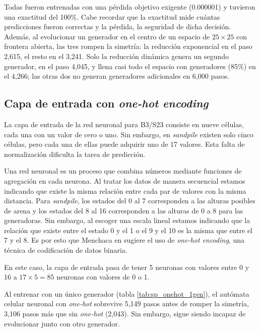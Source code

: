 Todas fueron entrenadas con una pérdida objetivo exigente (0.000001) y tuvieron una exactitud del 100\%. Cabe recordar que la exactitud mide cuántas predicciones fueron correctas y la pérdida, la seguridad de dicha decisión. Además, al evolucionar un generador en el centro de un espacio de $25 \times 25$ con frontera abierta, las tres rompen la simetría: la reducción exponencial en el paso 2,615, el resto en el 3,241. Solo la reducción dinámica genera un segundo generador, en el paso 4,045, y llena casi todo el espacio con generadores (85\%) en el 4,266; las otras dos no generan generadores adicionales en 6,000 pasos.

\subsection{Capa de entrada con \textit{one-hot encoding}}

La capa de entrada de la red neuronal para B3/S23 consiste en nueve células, cada una con un valor de cero o uno. Sin embargo, en \textit{sandpile} existen solo cinco células, pero cada una de ellas puede adquirir uno de 17 valores. Esta falta de normalización dificulta la tarea de predicción. 

Una red neuronal es un proceso que combina números mediante funciones de agregación en cada neurona. Al tratar los datos de manera secuencial estamos indicando que existe la misma relación entre cada par de valores con la misma distancia. Para \textit{sandpile}, los estados del 0 al 7 corresponden a las alturas posibles de arena y los estados del 8 al 16 corresponden a las alturas de 0 a 8 para las generadoras. Sin embargo, al escoger una escala lineal estamos indicando que la relación que existe entre el estado 0 y el 1 o el 9 y el 10 es la misma que entre el 7 y el 8. Es por esto que Menchaca en \cite{MenchacaMendez2022} sugiere el uso de \textit{one-hot encoding}, una técnica de codificación de datos binaria.

En este caso, la capa de entrada pasa de tener 5 neuronas con valores entre 0 y 16 a $17 \times 5 = 85$ neuronas con valores de 0 o 1.

Al entrenar con un único generador (tabla \ref{tab:sp_onehot_1gen}), el autómata celular neuronal con \textit{one-hot} sobrevive 5,149 pasos antes de romper la simetría, 3,106 pasos más que sin \textit{one-hot} (2,043). Sin embargo, sigue siendo incapaz de evolucionar junto con otro generador.

